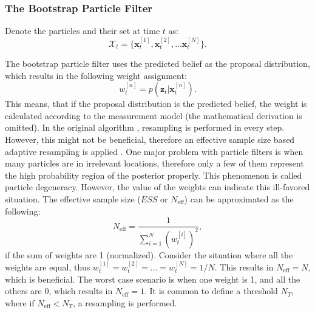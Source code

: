 \subsubsection{The Bootstrap Particle Filter}

Denote the particles and their set at time $t$  as:
\begin{equation}\label{key}
    \mathcal{X}_t = \{\mathbf{x}_t^{[1]},\mathbf{x}_t^{[2]}, \dots \mathbf{x}_t^{[N]}\}.
\end{equation}

The bootstrap particle filter uses the predicted belief as the proposal distribution, which results in the following weight assignment:
\begin{equation}\label{key}
    w_t^{[n]} = p(\mathbf{z}_t|\mathbf{x}_t^{[n]}).
\end{equation}
This means, that  if the proposal distribution is the predicted belief, the weight is calculated according to the measurement model (the mathematical derivation is omitted). In the original algorithm \cite{Gordon1993}, resampling is performed in every step. However, this might not be beneficial, therefore an effective sample size based adaptive resampling is applied \cite{Liu2004}. One major problem with particle filters is when many particles are in irrelevant locations, therefore only a few of them represent the high probability region of the posterior properly. This phenomenon is called particle degeneracy. However, the value of the weights can indicate this ill-favored situation. The effective sample size ($ESS$ or $N_{\mathrm{eff}}$) can be approximated as the following:
\begin{equation}\label{eq:neff}
    N_{\mathrm{eff}} = \frac{1}{\sum_{i = 1}^{N}(w_t^{[i]})^2},
\end{equation}
if the sum of weights are 1 (normalized). Consider the situation where all the weights are equal, thus $w_t^{[1]} = w_t^{[2]} = \dots = w_t^{[N]} = 1/N$. This results in $N_{\mathrm{eff}} = N$, which is beneficial. The worst case scenario is when one weight is 1, and all the others are 0, which results in $N_{\mathrm{eff}} = 1$. It is common to define a threshold $N_{T}$, where if $N_{\mathrm{eff}} < N_T$, a resampling is performed.

